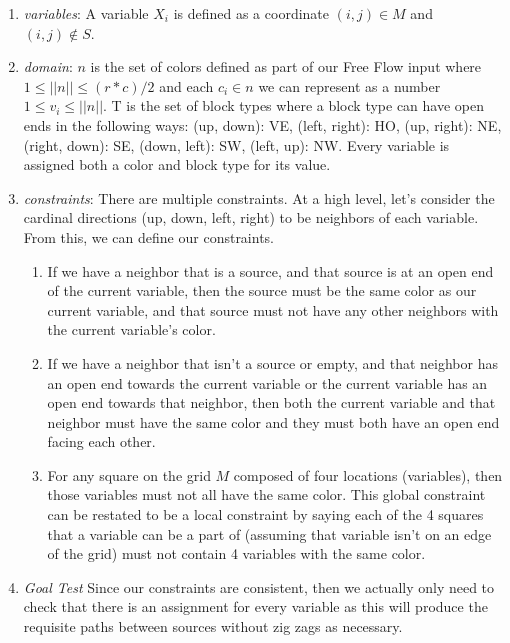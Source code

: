 \documentclass[11pt]{article}
\begin{document}
\begin{enumerate}
\item \textit{variables}: A variable $X_i$ is defined as a coordinate $(i, j) \in M$ and $(i, j) \not\in S$.
\item \textit{domain}: $n$ is the set of colors defined as part of our Free Flow input where $1 \leq ||n|| \leq (r*c)/2$ and each $c_i \in n$ we can represent as a number $1 \leq v_i \leq ||n||$. T is the set of block types where a block type can have open ends in the following ways: {(up, down): VE, (left, right): HO, (up, right): NE, (right, down): SE, (down, left): SW, (left, up): NW}. Every variable is assigned both a color and block type for its value.
\item \textit{constraints}:
There are multiple constraints. At a high level, let's consider the cardinal directions (up, down, left, right) to be neighbors of each variable. From this, we can define our constraints.

\begin{enumerate}
\item
If we have a neighbor that is a source, and that source is at an open end of the current variable, then the source must be the same color as our current variable, and that source must not have any other neighbors with the current variable's color.

\item
If we have a neighbor that isn't a source or empty, and that neighbor has an open end towards the current variable or the current variable has an open end towards that neighbor, then both the current variable and that neighbor must have the same color and they must both have an open end facing each other.

\item
For any square on the grid $M$ composed of four locations (variables), then those variables must not all have the same color. This global constraint can be restated to be a local constraint by saying each of the 4 squares that a variable can be a part of (assuming that variable isn't on an edge of the grid) must not contain 4 variables with the same color.

\end{enumerate}
\item \textit{Goal Test}
Since our constraints are consistent, then we actually only need to check that there is an assignment for every variable as this will produce the requisite paths between sources without zig zags as necessary.
\end{enumerate}
\end{document}

